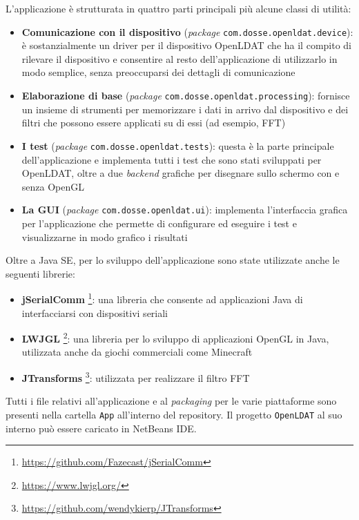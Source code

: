 L'applicazione è strutturata in quattro parti principali più alcune classi di utilità:
\begin{itemize}
	\item \textbf{Comunicazione con il dispositivo} (\textit{package} \texttt{com.dosse.openldat.device}): è sostanzialmente un driver per il dispositivo OpenLDAT che ha il compito di rilevare il dispositivo e consentire al resto dell'applicazione di utilizzarlo in modo semplice, senza preoccuparsi dei dettagli di comunicazione
	\item \textbf{Elaborazione di base} (\textit{package} \texttt{com.dosse.openldat.processing}): fornisce un insieme di strumenti per memorizzare i dati in arrivo dal dispositivo e dei filtri che possono essere applicati su di essi (ad esempio, FFT)
	\item \textbf{I test} (\textit{package} \texttt{com.dosse.openldat.tests}): questa è la parte principale dell'applicazione e implementa tutti i test che sono stati sviluppati per OpenLDAT, oltre a due \textit{backend} grafiche per disegnare sullo schermo con e senza OpenGL
	\item \textbf{La GUI} (\textit{package} \texttt{com.dosse.openldat.ui}): implementa l'interfaccia grafica per l'applicazione che permette di configurare ed eseguire i test e visualizzarne in modo grafico i risultati
\end{itemize}

Oltre a Java SE, per lo sviluppo dell'applicazione sono state utilizzate anche le seguenti librerie:
\begin{itemize}
	\item \textbf{jSerialComm} \footnote{\url{https://github.com/Fazecast/jSerialComm}}: una libreria che consente ad applicazioni Java di interfacciarsi con dispositivi seriali
	\item \textbf{LWJGL} \footnote{\url{https://www.lwjgl.org/}}: una libreria per lo sviluppo di applicazioni OpenGL in Java, utilizzata anche da giochi commerciali come Minecraft
	\item \textbf{JTransforms} \footnote{\url{https://github.com/wendykierp/JTransforms}}: utilizzata per realizzare il filtro FFT
\end{itemize}

Tutti i file relativi all'applicazione e al \textit{packaging} per le varie piattaforme sono presenti nella cartella \texttt{App} all'interno del repository. Il progetto \texttt{OpenLDAT} al suo interno può essere caricato in NetBeans IDE.


